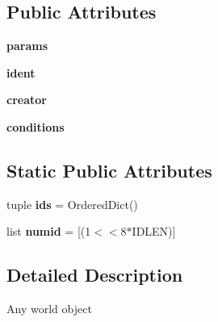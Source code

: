 \subsection*{\-Public \-Attributes}
\begin{DoxyCompactItemize}
\item 
\hypertarget{classworld_1_1_object_a3f8407bd1346f29b95bd651bf645bcbe}{{\bfseries params}}\label{classworld_1_1_object_a3f8407bd1346f29b95bd651bf645bcbe}

\item 
\hypertarget{classworld_1_1_object_a23980bf5784d05a3df4044d8486d8903}{{\bfseries ident}}\label{classworld_1_1_object_a23980bf5784d05a3df4044d8486d8903}

\item 
\hypertarget{classworld_1_1_object_a08866b3b943784acf45fbbb9351565a3}{{\bfseries creator}}\label{classworld_1_1_object_a08866b3b943784acf45fbbb9351565a3}

\item 
\hypertarget{classworld_1_1_object_a0534d4fbdc73788cb26f9ff1f3bc26b4}{{\bfseries conditions}}\label{classworld_1_1_object_a0534d4fbdc73788cb26f9ff1f3bc26b4}

\end{DoxyCompactItemize}
\subsection*{\-Static \-Public \-Attributes}
\begin{DoxyCompactItemize}
\item 
\hypertarget{classworld_1_1_object_a89b66757b74567b9aa191793ab0615c8}{tuple {\bfseries ids} = \-Ordered\-Dict()}\label{classworld_1_1_object_a89b66757b74567b9aa191793ab0615c8}

\item 
\hypertarget{classworld_1_1_object_af20280656c1b95195f6a5f11869dfb79}{list {\bfseries numid} = \mbox{[}(1$<$$<$8$\ast$\-I\-D\-L\-E\-N)\mbox{]}}\label{classworld_1_1_object_af20280656c1b95195f6a5f11869dfb79}

\end{DoxyCompactItemize}


\subsection{\-Detailed \-Description}
\begin{DoxyVerb}Any world object \end{DoxyVerb}
 

